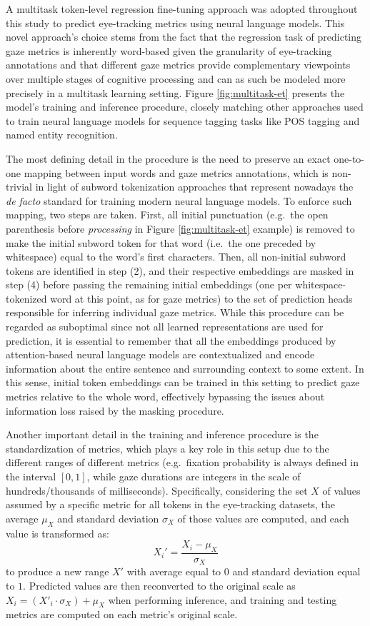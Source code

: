 \documentclass[a4paper, nobind]{templates/ociamthesis}
\begin{document}
A multitask token-level regression fine-tuning approach was adopted throughout this study to predict eye-tracking metrics using neural language models. This novel approach's choice stems from the fact that the regression task of predicting gaze metrics is inherently word-based given the granularity of eye-tracking annotations and that different gaze metrics provide complementary viewpoints over multiple stages of cognitive processing and can as such be modeled more precisely in a multitask learning setting. Figure \ref{fig:multitask-et} presents the model's training and inference procedure, closely matching other approaches used to train neural language models for sequence tagging tasks like POS tagging and named entity recognition.

The most defining detail in the procedure is the need to preserve an exact one-to-one mapping between input words and gaze metrics annotations, which is non-trivial in light of subword tokenization approaches that represent nowadays the \emph{de facto} standard for training modern neural language models. To enforce such mapping, two steps are taken. First, all initial punctuation (e.g.~the open parenthesis before \emph{processing} in Figure \ref{fig:multitask-et} example) is removed to make the initial subword token for that word (i.e.~the one preceded by whitespace) equal to the word's first characters. Then, all non-initial subword tokens are identified in step (2), and their respective embeddings are masked in step (4) before passing the remaining initial embeddings (one per whitespace-tokenized word at this point, as for gaze metrics) to the set of prediction heads responsible for inferring individual gaze metrics. While this procedure can be regarded as suboptimal since not all learned representations are used for prediction, it is essential to remember that all the embeddings produced by attention-based neural language models are contextualized and encode information about the entire sentence and surrounding context to some extent. In this sense, initial token embeddings can be trained in this setting to predict gaze metrics relative to the whole word, effectively bypassing the issues about information loss raised by the masking procedure.

Another important detail in the training and inference procedure is the standardization of metrics, which plays a key role in this setup due to the different ranges of different metrics (e.g.~fixation probability is always defined in the interval \([0,1]\), while gaze durations are integers in the scale of hundreds/thousands of milliseconds). Specifically, considering the set \(X\) of values assumed by a specific metric for all tokens in the eye-tracking datasets, the average \(\mu_X\) and standard deviation \(\sigma_X\) of those values are computed, and each value is transformed as:
\begin{equation}
X_i' = \frac{X_i - \mu_X}{\sigma_X}
\end{equation}
to produce a new range \(X'\) with average equal to \(0\) and standard deviation equal to \(1\). Predicted values are then reconverted to the original scale as \(X_i = (X'_i \cdot \sigma_X) + \mu_X\) when performing inference, and training and testing metrics are computed on each metric's original scale.
\end{document}
